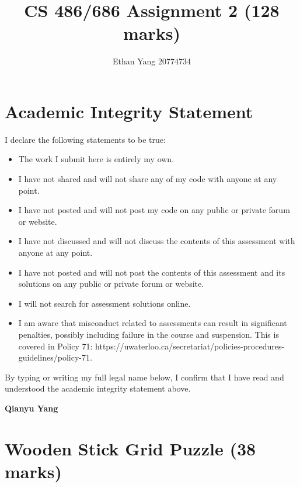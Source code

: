 \documentclass[12pt]{article}
\title{CS 486/686 Assignment 2 (128 marks)}
\author{Ethan Yang 20774734}
\begin{document}
\maketitle

\newcommand{\blue}{\color{blue}}

\newpage
\section*{Academic Integrity Statement}



I declare the following statements to be true:

\begin{itemize}
\item 
The work I submit here is entirely my own.

\item 	
I have not shared and will not share any of my code with anyone at any point. 

\item 
I have not posted and will not post my code on any public or private forum or website.

\item 	
I have not discussed and will not discuss the contents of this assessment with anyone at any point.

\item 
I have not posted and will not post the contents of this assessment and its solutions on any public or private forum or website. 

\item 
I will not search for assessment solutions online.

\item 
I am aware that misconduct related to assessments can result in significant penalties, possibly including failure in the course and suspension. This is covered in Policy 71: https://uwaterloo.ca/secretariat/policies-procedures-guidelines/policy-71.
\end{itemize}

By typing or writing my full legal name below, I confirm that I have read and understood the academic integrity statement above.

{\bf\large Qianyu Yang}




\newpage
\section{Wooden Stick Grid Puzzle (38 marks)}
\end{document}
